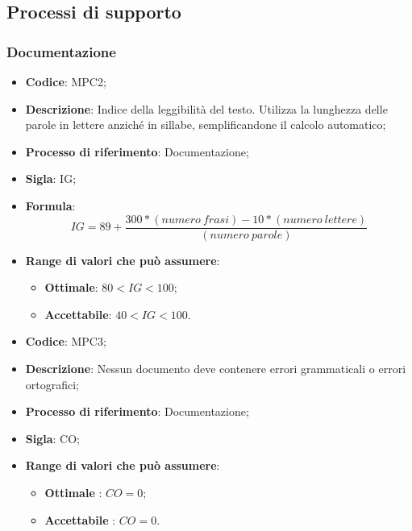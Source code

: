 \subsection{Processi di supporto}
\subsubsection{Documentazione}
\vspace{-1cm}
\begin{itemize}
	\item \textbf{Codice}: MPC2;
	\item \textbf{Descrizione}: Indice della leggibilità del testo. Utilizza la lunghezza delle parole in lettere anziché in sillabe, semplificandone il calcolo automatico;
	\item \textbf{Processo di riferimento}: Documentazione;
	\item \textbf{Sigla}: IG;
	\item \textbf{Formula}: \[ IG = 89 + \frac{300 \ast (numero \ frasi) - 10 \ast (numero \ lettere)}{(numero \ parole)} \]
	\item \textbf{Range di valori che può assumere}:
		\begin{itemize}
			\item \textbf{Ottimale}: $80 < IG < 100$;
			\item \textbf{Accettabile}: $40 < IG < 100$.
		\end{itemize}
\end{itemize}
\vspace{-1cm}
\begin{itemize}
	\item \textbf{Codice}: MPC3;
	\item \textbf{Descrizione}: Nessun documento deve contenere errori grammaticali o errori ortografici;
	\item \textbf{Processo di riferimento}: Documentazione;
	\item \textbf{Sigla}: CO;
	\item \textbf{Range di valori che può assumere}:
		\begin{itemize}
			\item \textbf{Ottimale} : $CO = 0$;
			\item \textbf{Accettabile} : $CO = 0$.
		\end{itemize}
\end{itemize}

